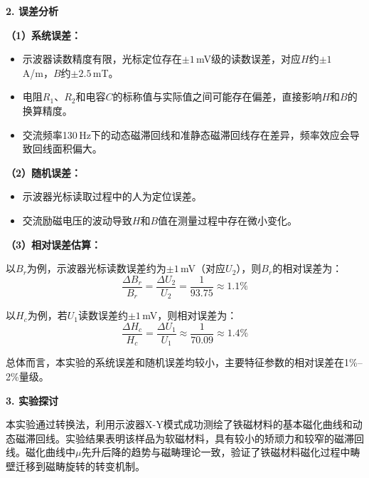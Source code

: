 \documentclass[a4paper,12pt]{article}
\begin{document}
\vspace{0.5cm}
{\fontsize{14pt}{20pt}\selectfont \textbf{2. 误差分析}}

\vspace{0.3cm}

{\fontsize{12pt}{18pt}\selectfont

\textbf{（1）系统误差：}

\begin{itemize}[nosep]
    \item 示波器读数精度有限，光标定位存在$\pm 1$\,mV级的读数误差，对应$H$约$\pm 1$\,A/m，$B$约$\pm 2.5$\,mT。
    \item 电阻$R_1$、$R_2$和电容$C$的标称值与实际值之间可能存在偏差，直接影响$H$和$B$的换算精度。
    \item 交流频率130\,Hz下的动态磁滞回线和准静态磁滞回线存在差异，频率效应会导致回线面积偏大。
\end{itemize}

\textbf{（2）随机误差：}

\begin{itemize}[nosep]
    \item 示波器光标读取过程中的人为定位误差。
    \item 交流励磁电压的波动导致$H$和$B$值在测量过程中存在微小变化。
\end{itemize}

\textbf{（3）相对误差估算：}

以$B_r$为例，示波器光标读数误差约为$\pm 1$\,mV（对应$U_2$），则$B_r$的相对误差为：
\begin{equation}
\frac{\Delta B_r}{B_r} = \frac{\Delta U_2}{U_2} = \frac{1}{93.75} \approx 1.1\%
\end{equation}

以$H_c$为例，若$U_1$读数误差约$\pm 1$\,mV，则相对误差为：
\begin{equation}
\frac{\Delta H_c}{H_c} = \frac{\Delta U_1}{U_1} \approx \frac{1}{70.09} \approx 1.4\%
\end{equation}

总体而言，本实验的系统误差和随机误差均较小，主要特征参数的相对误差在1\%--2\%量级。

}

\vspace{0.5cm}
{\fontsize{14pt}{20pt}\selectfont \textbf{3. 实验探讨}}

\vspace{0.3cm}

{\fontsize{12pt}{18pt}\selectfont

本实验通过转换法，利用示波器X-Y模式成功测绘了铁磁材料的基本磁化曲线和动态磁滞回线。实验结果表明该样品为软磁材料，具有较小的矫顽力和较窄的磁滞回线。磁化曲线中$\mu$先升后降的趋势与磁畴理论一致，验证了铁磁材料磁化过程中畴壁迁移到磁畴旋转的转变机制。

}
\end{document}
